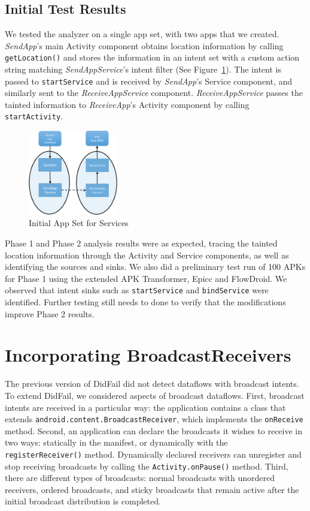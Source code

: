 \subsection{Initial Test Results}
We tested the analyzer on a single app set, with two apps that we created. \emph{SendApp}'s main Activity component obtains location information by calling \texttt{getLocation()} and stores the information in an intent set with a custom action string matching \emph{SendAppService}'s intent filter (See Figure~\ref{fig:servicetest1}). The intent is passed to \texttt{startService} and is received by \emph{SendApp}'s Service component, and similarly sent to the \emph{ReceiveAppService} component. \emph{ReceiveAppService} passes the tainted information to \emph{ReceiveApp}'s Activity component by calling \texttt{startActivity}.

\begin{figure}[h]
	\centering
	\includegraphics[width=0.35\textwidth]{serviceapp.pdf}
	\caption{Initial App Set for Services}
	\label{fig:servicetest1}
\end{figure}

Phase 1 and Phase 2 analysis results were as expected, tracing the tainted location information through the Activity and Service components, as well as identifying the sources and sinks. We also did a preliminary test run of 100 APKs for Phase 1 using the extended APK Transformer, Epicc and FlowDroid. We observed that intent sinks such as \texttt{startService} and \texttt{bindService} were identified. Further testing still needs to done to verify that the modifications improve Phase 2 results.

\section{Incorporating BroadcastReceivers}
The previous version of DidFail did not detect dataflows with broadcast intents. To extend DidFail, we considered aspects of broadcast dataflows. First, broadcast intents are received in a particular way: the application contains a class that extends \texttt{android.content.BroadcastReceiver}, which implements the \texttt{onReceive} method. Second, an application can declare the broadcasts it wishes to receive in two ways: statically in the manifest, or dynamically with the \texttt{registerReceiver()} method. Dynamically declared receivers can unregister and stop receiving broadcasts by calling the \texttt{Activity.onPause()} method. Third, there are different types of broadcasts: normal broadcasts with unordered receivers, ordered broadcasts, and sticky broadcasts that remain active after the initial broadcast distribution is completed.

